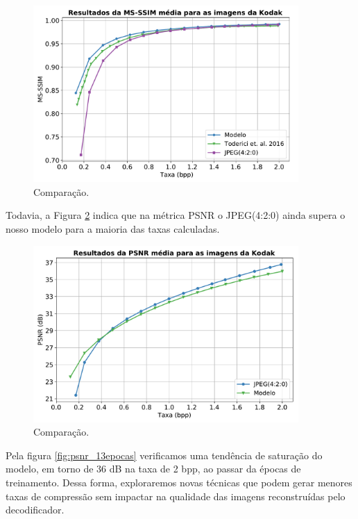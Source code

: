 \begin{figure}
	\centering
	\includegraphics[width=0.9\textwidth]{figuras/msssim_ae_jpeg_toderici.pdf}
	\caption{Comparação.}
	\label{fig:msssim_ae_jpeg_toderici}
\end{figure}	


Todavia, a Figura \ref{fig:psnr_ae_jpeg} indica que na métrica PSNR o JPEG(4:2:0) ainda supera o nosso modelo para a maioria das taxas calculadas. 

\begin{figure}
	\centering
	\includegraphics[width=0.9\textwidth]{figuras/psnr_ae_jpeg.pdf}
	\caption{Comparação.}
	\label{fig:psnr_ae_jpeg}
\end{figure}	


Pela figura \ref{fig:psnr_13epocas} verificamos uma tendência de saturação do modelo, em torno de 36 dB na taxa de 2 bpp, ao passar da épocas de treinamento. Dessa forma, exploraremos novas técnicas que podem gerar menores taxas de compressão sem impactar na qualidade das imagens reconstruídas pelo decodificador.


